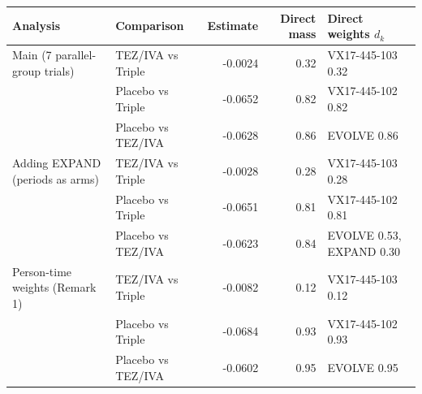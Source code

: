 \begin{tabular}{llrrl}
\toprule
Analysis & Comparison & Estimate & Direct mass & Direct weights $d_k$ \\
\midrule
Main (7 parallel-group trials) & TEZ/IVA vs Triple & -0.0024 & 0.32 & VX17-445-103 0.32 \\
 & Placebo vs Triple & -0.0652 & 0.82 & VX17-445-102 0.82 \\
 & Placebo vs TEZ/IVA & -0.0628 & 0.86 & EVOLVE 0.86 \\
\addlinespace
Adding EXPAND (periods as arms) & TEZ/IVA vs Triple & -0.0028 & 0.28 & VX17-445-103 0.28 \\
 & Placebo vs Triple & -0.0651 & 0.81 & VX17-445-102 0.81 \\
 & Placebo vs TEZ/IVA & -0.0623 & 0.84 & EVOLVE 0.53, EXPAND 0.30 \\
\addlinespace
Person-time weights (Remark 1) & TEZ/IVA vs Triple & -0.0082 & 0.12 & VX17-445-103 0.12 \\
 & Placebo vs Triple & -0.0684 & 0.93 & VX17-445-102 0.93 \\
 & Placebo vs TEZ/IVA & -0.0602 & 0.95 & EVOLVE 0.95 \\
\bottomrule
\end{tabular}
